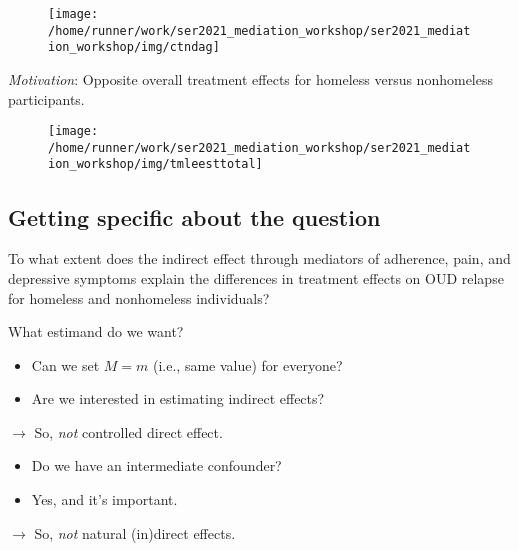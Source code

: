 \documentclass[
  12pt,
]{book}
\providecommand{\tightlist}{%
  \setlength{\itemsep}{0pt}\setlength{\parskip}{0pt}}
\theoremstyle{definition}
\theoremstyle{definition}
\theoremstyle{definition}
\newcommand{\1}{\mathbbm{1}}
\begin{document}
\begin{figure}

{\centering \texttt{[image: /home/runner/work/ser2021\_mediation\_workshop/ser2021\_mediation\_workshop/img/ctndag]} 

}

\end{figure}

\emph{Motivation}: Opposite overall treatment effects for homeless versus
nonhomeless participants.

\begin{figure}

{\centering \texttt{[image: /home/runner/work/ser2021\_mediation\_workshop/ser2021\_mediation\_workshop/img/tmleesttotal]} 

}

\end{figure}

\hypertarget{getting-specific-about-the-question}{%
\subsection{Getting specific about the question}\label{getting-specific-about-the-question}}

To what extent does the indirect effect through mediators of adherence, pain, and
depressive symptoms explain the differences in treatment effects on OUD relapse
for homeless and nonhomeless individuals?

What estimand do we want?

\begin{itemize}
\tightlist
\item
  Can we set \(M=m\) (i.e., same value) for everyone?
\item
  Are we interested in estimating indirect effects?
\end{itemize}

\(\rightarrow\) So, \emph{not} controlled direct effect.

\begin{itemize}
\tightlist
\item
  Do we have an intermediate confounder?
\item
  Yes, and it's important.
\end{itemize}

\(\rightarrow\) So, \emph{not} natural (in)direct effects.
\end{document}
